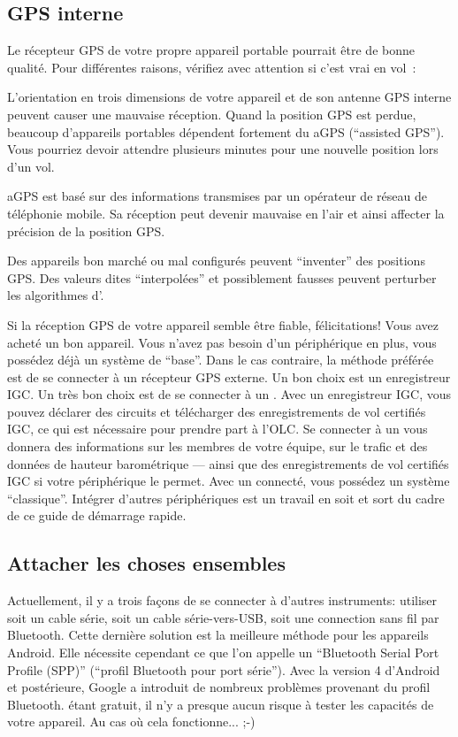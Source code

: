 \documentclass[french, a4paper, 12pt]{refrep}
\begin{document}
\subsection{\textcolor{flashblue}{GPS interne}}
Le récepteur GPS de votre propre appareil portable pourrait être de bonne qualité.
Pour différentes raisons, vérifiez avec attention si c'est vrai en vol~:

\begin{compactitem}
\item L'orientation en trois dimensions de votre appareil et de son antenne GPS
interne peuvent causer une mauvaise réception. Quand la position GPS est perdue, beaucoup
d'appareils portables dépendent fortement du aGPS (``assisted GPS''). Vous pourriez devoir attendre
plusieurs minutes pour une nouvelle position lors d'un vol.
\item aGPS est basé sur des informations transmises par un opérateur de réseau de téléphonie
mobile. Sa réception peut devenir mauvaise en l'air et ainsi affecter la précision de la
position GPS.
\item Des appareils bon marché ou mal configurés peuvent ``inventer'' des positions GPS. Des valeurs
dites ``interpolées'' et possiblement fausses peuvent perturber les algorithmes d'\xc.
\end{compactitem}

Si la réception GPS de votre appareil semble être fiable, félicitations! Vous
avez acheté un bon appareil. Vous n'avez pas besoin d'un périphérique en plus, vous possédez déjà
un système \xc{} de ``base''. Dans le cas contraire, la méthode préférée est de se connecter à un récepteur
GPS externe. Un bon choix est un enregistreur IGC. Un très bon choix est de se connecter à un \fl.
Avec un enregistreur IGC, vous pouvez déclarer des circuits et télécharger des enregistrements de vol
certifiés IGC, ce qui est nécessaire pour prendre part à l'OLC.
Se connecter à un \fl{} vous donnera des informations sur les membres de votre équipe,
sur le trafic et des données de hauteur barométrique --- ainsi que des enregistrements de vol certifiés IGC
si votre périphérique le permet.
Avec un \fl{} connecté, vous possédez un système \xc{} ``classique''. Intégrer d'autres
périphériques est un travail en soit et sort du cadre de ce guide de démarrage rapide.

\subsection{\textcolor{flashblue}{Attacher les choses ensembles}}
Actuellement, il y a trois façons de se connecter à d'autres instruments: utiliser soit
un cable série, soit un cable série-vers-USB, soit une connection sans fil par Bluetooth. Cette
dernière solution est la meilleure méthode pour les appareils Android. Elle nécessite cependant
ce que l'on appelle un ``Bluetooth Serial Port Profile (SPP)'' (``profil Bluetooth pour port série'').
Avec la version 4 d'Android et postérieure, Google a introduit de nombreux problèmes provenant du profil Bluetooth.
\xc{} étant gratuit, il n'y a presque aucun risque à tester les capacités de votre appareil. Au cas où cela fonctionne... ;-)
\end{document}

